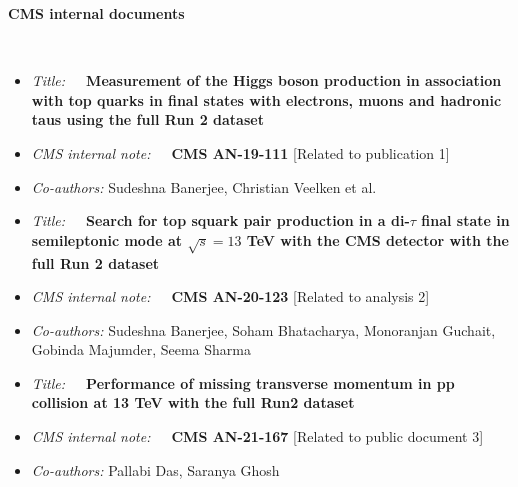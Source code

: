 \documentclass[12pt, a4paper]{article}
\begin{document}
\begin{itemize}
\vspace{0.5cm}
{\huge
	\item[\textbf{3}]\textbf{ CMS internal documents}}\\
	\begin{itemize}
	\item[1.]\textit{Title:}~~~\textbf{Measurement of the Higgs boson production in association
		with top quarks in final states with electrons, muons and hadronic taus using the full Run 2 dataset}
	\item[]\textit{CMS internal note:}~~~\textbf{CMS AN-19-111} [Related to publication 1]
	\item[]\textit{Co-authors:} Sudeshna Banerjee, Christian Veelken et al.
	
	\item[2.]\textit{Title:}~~~\textbf{Search for top squark pair production in a di-$\tau$ final state in semileptonic mode at $\sqrt{s} = 13$ TeV with the CMS detector with the full Run 2 dataset}
	\item[]\textit{CMS internal note:}~~~\textbf{CMS AN-20-123} [Related to analysis 2]
	\item[]\textit{Co-authors:} Sudeshna Banerjee, Soham Bhatacharya, Monoranjan Guchait, Gobinda
	Majumder, Seema Sharma
	
	\item[3.]\textit{Title:}~~~\textbf{Performance of missing transverse momentum in pp collision at 13 TeV with the full Run2 dataset}
	\item[]\textit{CMS internal note:}~~~\textbf{CMS AN-21-167} [Related to public document 3]
	\item[]\textit{Co-authors:} Pallabi Das, Saranya Ghosh
	\end{itemize}
\end{itemize}
\thispagestyle{empty}
\clearpage


\tableofcontents
\thispagestyle{empty}
\clearpage
\setcounter{page}{1}
\end{document}
